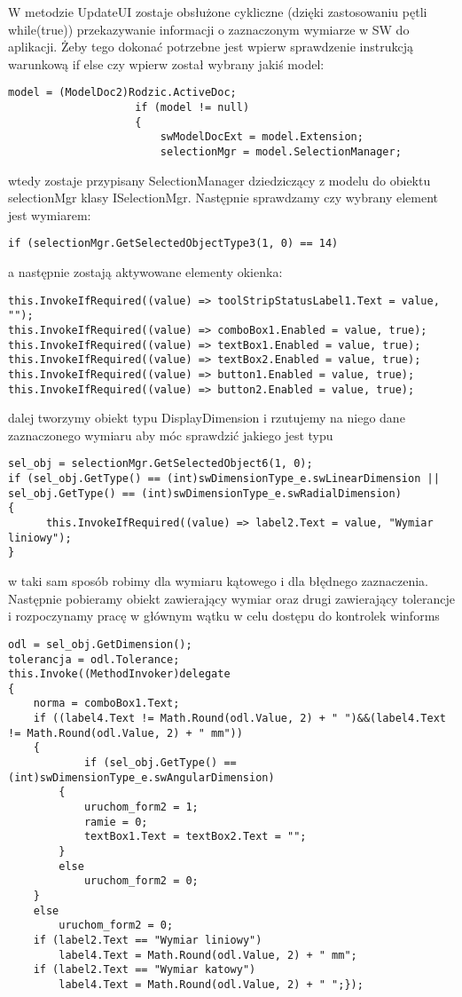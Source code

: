 \documentclass[11pt,a4paper]{article}
\begin{document}
W metodzie UpdateUI zostaje obsłużone cykliczne (dzięki zastosowaniu pętli while(true)) przekazywanie informacji o zaznaczonym wymiarze w SW do aplikacji. Żeby tego dokonać potrzebne jest wpierw sprawdzenie instrukcją warunkową if else czy wpierw został wybrany jakiś model:
\newline
\begin{lstlisting}
model = (ModelDoc2)Rodzic.ActiveDoc;
                    if (model != null)
                    {
                        swModelDocExt = model.Extension;
                        selectionMgr = model.SelectionManager;       
\end{lstlisting}
wtedy zostaje przypisany SelectionManager dziedziczący z modelu do obiektu selectionMgr klasy ISelectionMgr.
Następnie sprawdzamy czy wybrany element jest wymiarem:
\begin{lstlisting}
if (selectionMgr.GetSelectedObjectType3(1, 0) == 14)       
\end{lstlisting}
\newpage
a następnie zostają aktywowane elementy okienka:
\begin{lstlisting}
this.InvokeIfRequired((value) => toolStripStatusLabel1.Text = value, "");
this.InvokeIfRequired((value) => comboBox1.Enabled = value, true);
this.InvokeIfRequired((value) => textBox1.Enabled = value, true);                  
this.InvokeIfRequired((value) => textBox2.Enabled = value, true);
this.InvokeIfRequired((value) => button1.Enabled = value, true);
this.InvokeIfRequired((value) => button2.Enabled = value, true);
\end{lstlisting}
dalej tworzymy obiekt typu DisplayDimension i rzutujemy na niego dane zaznaczonego wymiaru aby móc sprawdzić jakiego jest typu
\begin{lstlisting}
sel_obj = selectionMgr.GetSelectedObject6(1, 0);                                   
if (sel_obj.GetType() == (int)swDimensionType_e.swLinearDimension || sel_obj.GetType() == (int)swDimensionType_e.swRadialDimension)
{
      this.InvokeIfRequired((value) => label2.Text = value, "Wymiar liniowy");     
}
\end{lstlisting}
w taki sam sposób robimy dla wymiaru kątowego i dla błędnego zaznaczenia. Następnie pobieramy obiekt zawierający wymiar oraz drugi zawierający tolerancje i rozpoczynamy pracę w głównym wątku w celu dostępu do kontrolek winforms
\newline
\begin{lstlisting}
odl = sel_obj.GetDimension(); 
tolerancja = odl.Tolerance; 
this.Invoke((MethodInvoker)delegate
{
	norma = comboBox1.Text;
	if ((label4.Text != Math.Round(odl.Value, 2) + " ")&&(label4.Text != Math.Round(odl.Value, 2) + " mm"))
	{
			if (sel_obj.GetType() == (int)swDimensionType_e.swAngularDimension)
		{
			uruchom_form2 = 1;
			ramie = 0;
			textBox1.Text = textBox2.Text = "";
		}
		else
			uruchom_form2 = 0;
	}
	else
		uruchom_form2 = 0;
	if (label2.Text == "Wymiar liniowy")
		label4.Text = Math.Round(odl.Value, 2) + " mm";
	if (label2.Text == "Wymiar katowy")
		label4.Text = Math.Round(odl.Value, 2) + " ";});
\end{lstlisting}
\end{document}
